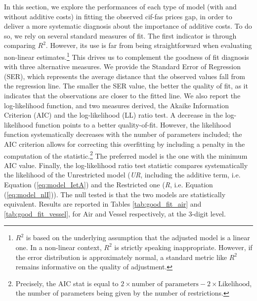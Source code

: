 \documentclass[a4paper,11pt]{article}
\begin{document}
In this section, we explore the performances of each type of model (with and without additive costs) in fitting the observed cif-fas prices gap, in order to deliver a more systematic diagnosis about the importance of additive costs. To do so, we rely on several standard measures of fit. The first indicator is through comparing $R^{2}$. However, its use is far from being straightforward when evaluating non-linear estimates.\footnote{$R^2$ is based on the underlying assumption that the adjusted model is a linear one. In a non-linear context, $R^2$ is strictly speaking inappropriate. However, if the error distribution is approximately normal, a standard metric like $R^2$ remains informative on the quality of adjustment.} This drives us to complement the goodness of fit diagnosis with three alternative measures. We provide the Standard Error of Regression (SER), which represents the average distance that the observed values fall from the regression line. The smaller the SER value, the better the quality of fit, as it indicates that the observations are closer to the fitted line. We also report the log-likelihood function, and two measures derived, the Akaike Information Criterion (AIC) and the log-likelihood (LL) ratio test. A decrease in the log-likelihood function points to a better quality-of-fit. However, the likelihood function systematically decreases with the number of parameters included; the AIC criterion allows for correcting this overfitting by including a penalty in the computation of the statistic.\footnote{Precisely, the AIC stat is equal to $2 \times \textrm{number of parameters} - 2 \times \textrm{Likelihood} $, the number of parameters being given by the number of restrictions.} The preferred model is the one with the minimum AIC value. Finally, the log-likelihood ratio test statistic compares systematically the likelihood of the Unrestricted model (\emph{UR}, including the additive term, i.e. Equation (\ref{eq:model_IetA}) and the Restricted one (\emph{R}, i.e. Equation (\ref{eq:model_nlI})). The null tested is that the two models are statistically equivalent. Results are reported in Tables \ref{tab:good_fit_air} and \ref{tab:good_fit_vessel}, for Air and Vessel respectively, at the 3-digit level.
\end{document}
